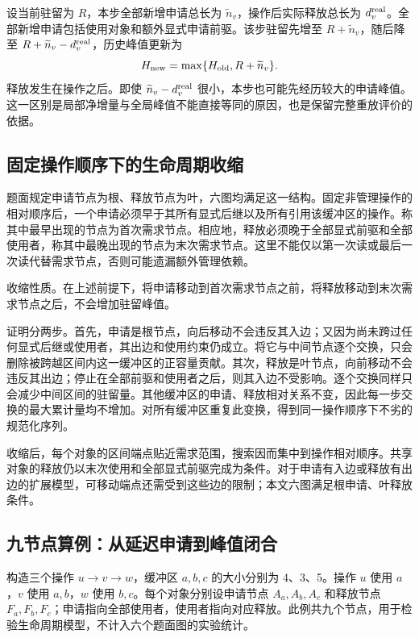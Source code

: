 设当前驻留为 $R$，本步全部新增申请总长为 $\widetilde n_v$，操作后实际释放总长为 $d_v^{\rm real}$。全部新增申请包括使用对象和额外显式申请前驱。该步驻留先增至 $R+\widetilde n_v$，随后降至 $R+\widetilde n_v-d_v^{\rm real}$，历史峰值更新为
\begin{equation}
H_{\rm new}=\max\{H_{\rm old},R+\widetilde n_v\}.
\label{eq:steppeak}
\end{equation}
释放发生在操作之后。即使 $\widetilde n_v-d_v^{\rm real}$ 很小，本步也可能先经历较大的申请峰值。这一区别是局部净增量与全局峰值不能直接等同的原因，也是保留完整重放评价的依据。

\subsection{固定操作顺序下的生命周期收缩}
题面规定申请节点为根、释放节点为叶，六图均满足这一结构。固定非管理操作的相对顺序后，一个申请必须早于其所有显式后继以及所有引用该缓冲区的操作。称其中最早出现的节点为首次需求节点。相应地，释放必须晚于全部显式前驱和全部使用者，称其中最晚出现的节点为末次需求节点。这里不能仅以第一次读或最后一次读代替需求节点，否则可能遗漏额外管理依赖。

收缩性质。在上述前提下，将申请移动到首次需求节点之前，将释放移动到末次需求节点之后，不会增加驻留峰值。

证明分两步。首先，申请是根节点，向后移动不会违反其入边；又因为尚未跨过任何显式后继或使用者，其出边和使用约束仍成立。将它与中间节点逐个交换，只会删除被跨越区间内这一缓冲区的正容量贡献。其次，释放是叶节点，向前移动不会违反其出边；停止在全部前驱和使用者之后，则其入边不受影响。逐个交换同样只会减少中间区间的驻留量。其他缓冲区的申请、释放相对关系不变，因此每一步交换的最大累计量均不增加。对所有缓冲区重复此变换，得到同一操作顺序下不劣的规范化序列。

收缩后，每个对象的区间端点贴近需求范围，搜索因而集中到操作相对顺序。共享对象的释放仍以末次使用和全部显式前驱完成为条件。对于申请有入边或释放有出边的扩展模型，可移动端点还需受到这些边的限制；本文六图满足根申请、叶释放条件。

\subsection{九节点算例：从延迟申请到峰值闭合}
构造三个操作 $u\to v\to w$，缓冲区 $a,b,c$ 的大小分别为 4、3、5。操作 $u$ 使用 $a$，$v$ 使用 $a,b$，$w$ 使用 $b,c$。每个对象分别设申请节点 $A_a,A_b,A_c$ 和释放节点 $F_a,F_b,F_c$；申请指向全部使用者，使用者指向对应释放。此例共九个节点，用于检验生命周期模型，不计入六个题面图的实验统计。

